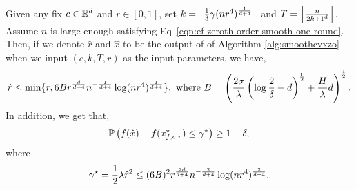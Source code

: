 \begin{corollary}
\label{corollary:zeroth-order-smooth-one-round}
Given any fix $c \in \mathbb{R}^d$ and $r\in [0, 1]$, set $k = \left\lfloor{\frac{1}{3} 
	\gamma(nr^4)^\frac{1}{d+4}}\right\rfloor$ and $T = \left\lfloor{\frac{n}{{2k+1}^d}}\right\rfloor$.
Assume $n$ is large enough satisfying Eq~\eqref{eqn:ef-zeroth-order-smooth-one-round}.
Then, if we denote $\hat{r}$ and $\hat{x}$ to be the output of of Algorithm
\ref{alg:smoothcvxzo} when we input $(c, k, T, r)$ as the input parameters,
 we have, 
\begin{equation*}
\hat{r} \leq \min\{r, 6B r^\frac{d}{d+4} n^{-\frac{1}{d+4}} \log (nr^4)^\frac{1}{d+4}\}, 
~\text{where}~B = \left(\frac{2\sigma}{\lambda} 
	\left(\log \frac{2}{\delta} + d\right)^{\frac{1}{2}} + \frac{H}{\lambda}d\right)^{\frac{1}{2}}.
\end{equation*}
In addition, we get that, 
\begin{equation*}
\mathbb{P}\left(f(\hat{x}) - f(x_{f, c, r}^\star) \leq \gamma^\star \right) \geq 1-\delta, 
\end{equation*}
where 
\begin{equation*}
\gamma^\star = \frac{1}{2} \lambda\hat{r}^2 \leq (6B)^2 
	r^\frac{2d}{d+4} n^{-\frac{2}{d+4}} \log (nr^4)^\frac{2}{d+4}.
\end{equation*}
\end{corollary}
%
%

